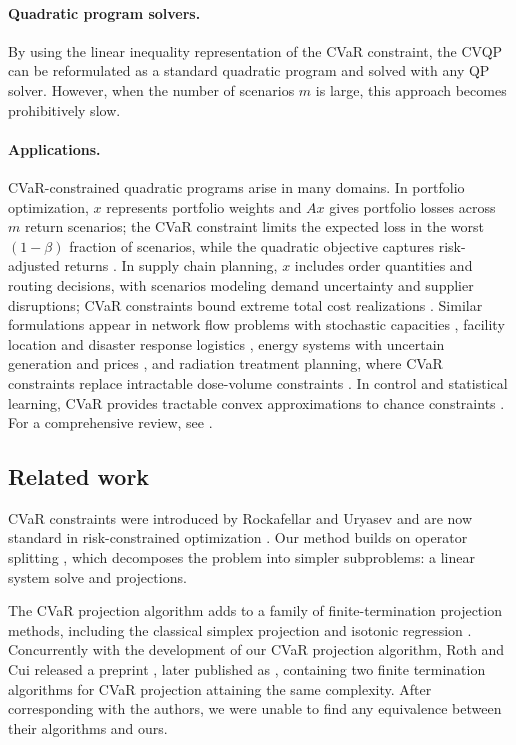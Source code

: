 \documentclass[12pt]{article}
\begin{document}
\paragraph{Quadratic program solvers.} By using the linear inequality
representation of the CVaR constraint, the CVQP can be reformulated as a
standard quadratic program and solved with any QP solver. However, when the
number of scenarios $m$ is large, this approach becomes prohibitively slow.

\paragraph{Applications.}
CVaR-constrained quadratic programs arise in many domains.
In portfolio optimization, $x$ represents portfolio weights and $Ax$
gives portfolio losses across $m$ return scenarios; the CVaR constraint
limits the expected loss in the worst $(1-\beta)$ fraction of scenarios,
while the quadratic objective captures risk-adjusted returns
\cite{krokhmal2002portfolio}.
In supply chain planning, $x$ includes order quantities and routing
decisions, with scenarios modeling demand uncertainty and supplier
disruptions; CVaR constraints bound extreme total cost realizations
\cite{sawik2011selection, gotoh2007newsvendor}.
Similar formulations appear in network flow problems with stochastic
capacities \cite{sorokin2013computational}, facility location and
disaster response logistics \cite{noyan2012risk}, energy systems
with uncertain generation and prices \cite{doege2006risk}, and radiation
treatment planning, where CVaR constraints replace intractable
dose-volume constraints \cite{romeijn2003novel}.
In control and statistical learning, CVaR provides tractable convex
approximations to chance constraints
\cite{van2015distributionally, laguel2021superquantiles}.
For a comprehensive review, see \cite{filippi2020conditional}.

\subsection{Related work}
CVaR constraints were introduced by Rockafellar and Uryasev
\cite{rockafellar2000optimization} and are now standard in risk-constrained
optimization \cite{krokhmal2002portfolio}. Our method builds on operator
splitting \cite{boyd2011distributed}, which decomposes the problem into simpler
subproblems: a linear system solve and projections.

The CVaR projection algorithm adds to a family of finite-termination projection
methods, including the classical simplex projection \cite{gafni1984two} and
isotonic regression \cite{barlow1972isotonic}. Concurrently with the
development of our CVaR projection algorithm, Roth and Cui released a preprint \cite{roth2023n}, 
later published as \cite{roth2025n}, containing two finite termination algorithms for CVaR projection attaining the
same complexity. After corresponding with the authors, we were
unable to find any equivalence between their algorithms and ours.
\end{document}
